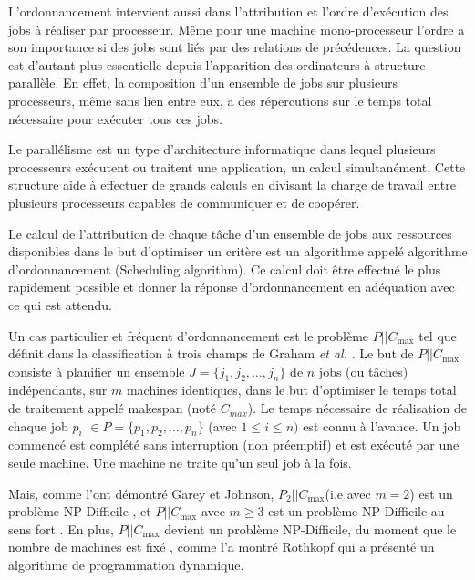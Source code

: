\documentclass[a4paper,12pt]{report}
\theoremstyle{plain}				%
\theoremstyle{definition}				%
\newcommand\problemGrahamPII{$P_2||C_{\max}$\xspace}	%
\newcommand\problemGrahamP{$P||C_{\max}$\xspace}
\newcommand{\fco}[1]{\todo[author=FCO,color=teal,inline]{#1}}
\begin{document}
L’ordonnancement intervient aussi dans l'attribution et l'ordre d’exécution des jobs à réaliser par processeur. 
Même pour une machine mono-processeur l'ordre a son importance si des jobs sont liés par des relations de précédences. 
La question est d'autant plus essentielle depuis l'apparition des ordinateurs à structure parallèle.
En effet, la composition d'un ensemble de jobs sur plusieurs processeurs, même sans lien entre eux, a des répercutions sur le temps total nécessaire pour exécuter tous ces jobs. 

Le parallélisme est un type d'architecture informatique dans lequel plusieurs processeurs exécutent 
  ou traitent une application, un calcul simultanément. 
Cette structure aide à effectuer de grands calculs en divisant la charge de travail entre plusieurs 
  processeurs capables de communiquer et de coopérer.     

Le calcul de l'attribution de chaque tâche d'un ensemble de jobs aux ressources disponibles 
  dans le but d'optimiser un critère est un algorithme 
  appelé algorithme d'ordonnancement (Scheduling algorithm). 
Ce calcul doit être effectué le plus rapidement possible et donner la réponse d'ordonnancement en 
  adéquation avec ce qui est attendu.


Un cas particulier et fréquent d'ordonnancement est le problème \problemGrahamP tel que définit 
  dans la classification à trois champs de Graham \emph{et al.} \cite{graham1979optimization}. 
Le but de \problemGrahamP consiste à planifier un ensemble $J=\{j_1, j_2, \ldots, j_n\}$ de 
  $n$ jobs (ou tâches) indépendants, 
  sur $m$ machines identiques,  
  dans le but d'optimiser le temps total de traitement appelé makespan (noté $C_{max}$).
Le temps nécessaire de réalisation de chaque job $p_i$ $\in P=\{p_1, p_2, \ldots, p_n\}$  
  (avec $1 \leq i \leq n)$ est connu à l'avance. 
Un job commencé est complété sans interruption (non préemptif) 
  et est exécuté par une seule machine. 
Une machine ne traite qu'un seul job à la fois. 

Mais, comme l'ont démontré Garey et Johnson, 
  \problemGrahamPII (i.e avec $m = 2$) est un problème NP-Difficile \cite{garey1978strong}, et 
  \problemGrahamP avec $m \geq 3$ est un problème NP-Difficile au sens fort \cite{garey1982computers}.
En plus, \problemGrahamP devient un problème NP-Difficile, du moment que le nombre de machines 
  est fixé \cite{chen1999potts}, comme l'a montré Rothkopf \cite{rothkopf1966scheduling} qui a 
  présenté un algorithme de programmation dynamique.%
\end{document}
